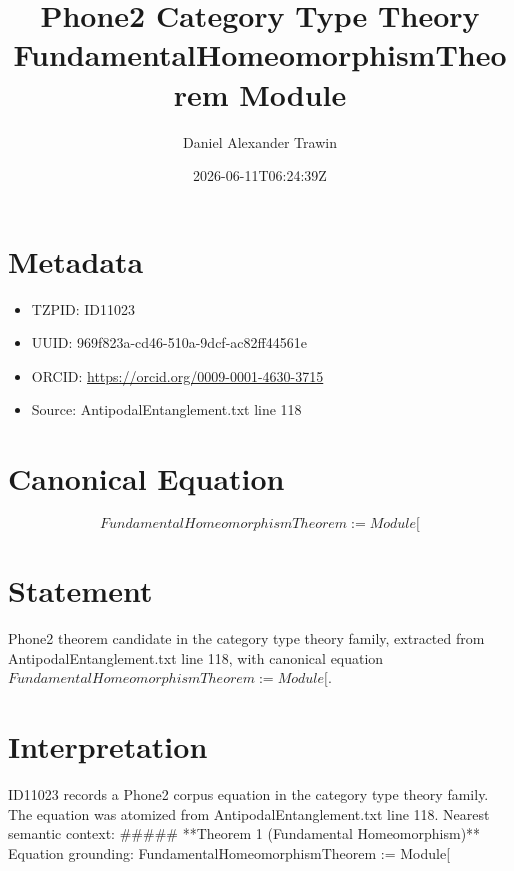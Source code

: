 \documentclass[11pt]{article}
\title{Phone2 Category Type Theory FundamentalHomeomorphismTheorem Module}
\author{Daniel Alexander Trawin}
\date{2026-06-11T06:24:39Z}
\begin{document}
\maketitle
\section*{Metadata}
\begin{itemize}
\item TZPID: ID11023
\item UUID: 969f823a-cd46-510a-9dcf-ac82ff44561e
\item ORCID: \url{https://orcid.org/0009-0001-4630-3715}
\item Source: AntipodalEntanglement.txt line 118
\end{itemize}
\section*{Canonical Equation}
\[
FundamentalHomeomorphismTheorem := Module[
\]
\section*{Statement}
Phone2 theorem candidate in the category type theory family, extracted from AntipodalEntanglement.txt line 118, with canonical equation $FundamentalHomeomorphismTheorem := Module[$.
\section*{Interpretation}
ID11023 records a Phone2 corpus equation in the category type theory family. The equation was atomized from AntipodalEntanglement.txt line 118. Nearest semantic context: ##### **Theorem 1 (Fundamental Homeomorphism)** Equation grounding: FundamentalHomeomorphismTheorem := Module[
\end{document}
